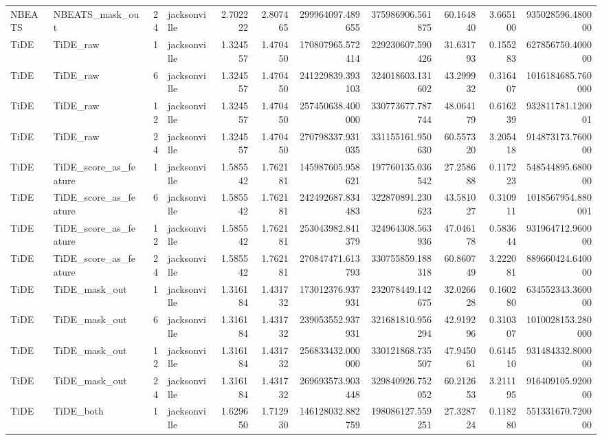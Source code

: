 \begin{longtable}{llrlrrrrrrr}
NBEATS & NBEATS\_mask\_out & 24 & jacksonville & 2.702222 & 2.807465 & 299964097.489655 & 375986906.561875 & 60.164840 & 3.665100 & 935028596.480000 \\
TiDE & TiDE\_raw & 1 & jacksonville & 1.324557 & 1.470450 & 170807965.572414 & 229230607.590426 & 31.631793 & 0.155283 & 627856750.400000 \\
TiDE & TiDE\_raw & 6 & jacksonville & 1.324557 & 1.470450 & 241229839.393103 & 324018603.131602 & 43.299932 & 0.316407 & 1016184685.760000 \\
TiDE & TiDE\_raw & 12 & jacksonville & 1.324557 & 1.470450 & 257450638.400000 & 330773677.787744 & 48.064179 & 0.616239 & 932811781.120001 \\
TiDE & TiDE\_raw & 24 & jacksonville & 1.324557 & 1.470450 & 270798337.931035 & 331155161.950630 & 60.557320 & 3.205418 & 914873173.760000 \\
TiDE & TiDE\_score\_as\_feature & 1 & jacksonville & 1.585542 & 1.762181 & 145987605.958621 & 197760135.036542 & 27.258688 & 0.117223 & 548544895.680000 \\
TiDE & TiDE\_score\_as\_feature & 6 & jacksonville & 1.585542 & 1.762181 & 242492687.834483 & 322870891.230623 & 43.581027 & 0.310911 & 1018567954.880001 \\
TiDE & TiDE\_score\_as\_feature & 12 & jacksonville & 1.585542 & 1.762181 & 253043982.841379 & 324964308.563936 & 47.046178 & 0.583644 & 931964712.960000 \\
TiDE & TiDE\_score\_as\_feature & 24 & jacksonville & 1.585542 & 1.762181 & 270847471.613793 & 330755859.188318 & 60.860749 & 3.222081 & 889660424.640000 \\
TiDE & TiDE\_mask\_out & 1 & jacksonville & 1.316184 & 1.431732 & 173012376.937931 & 232078449.142675 & 32.026628 & 0.160280 & 634552343.360000 \\
TiDE & TiDE\_mask\_out & 6 & jacksonville & 1.316184 & 1.431732 & 239053552.937931 & 321681810.956294 & 42.919296 & 0.310307 & 1010028153.280000 \\
TiDE & TiDE\_mask\_out & 12 & jacksonville & 1.316184 & 1.431732 & 256833432.000000 & 330121868.735507 & 47.945061 & 0.614510 & 931484332.800000 \\
TiDE & TiDE\_mask\_out & 24 & jacksonville & 1.316184 & 1.431732 & 269693573.903448 & 329840926.752052 & 60.212653 & 3.211195 & 916409105.920000 \\
TiDE & TiDE\_both & 1 & jacksonville & 1.629650 & 1.712930 & 146128032.882759 & 198086127.559251 & 27.328724 & 0.118280 & 551331670.720000 \\

\end{longtable}

